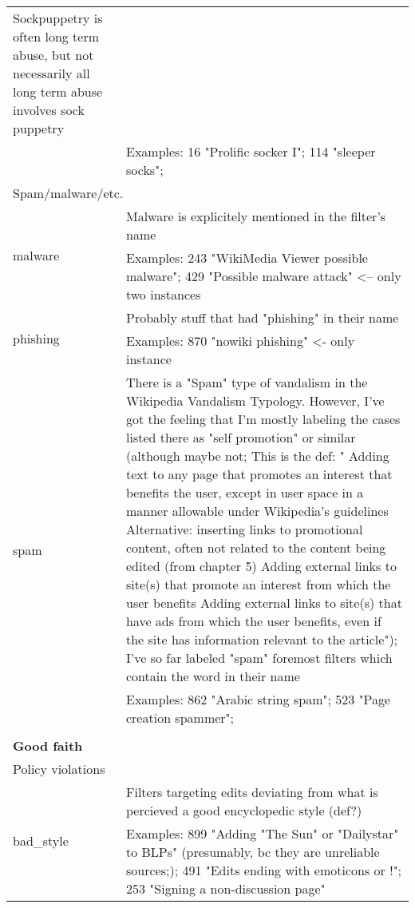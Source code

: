 \begin{longtable}{ | p{5cm} | p{9cm} | }
  Sockpuppetry is often long term abuse, but not necessarily all long term abuse involves sock puppetry \\
                                     & Examples: 16 "Prolific socker I"; 114 "sleeper socks";\\
    \hline \hline
        \multicolumn{2}{|l|}{Spam/malware/etc.} \\
    \hline
    \multirow{2}{*}{malware} & Malware is explicitely mentioned in the filter's name \\%
                                     & Examples: 243 "WikiMedia Viewer possible malware"; 429 "Possible malware attack" <-- only two instances\\
    \hline
    \multirow{2}{*}{phishing} & Probably stuff that had "phishing" in their name\\
                                     & Examples: 870 "nowiki phishing" <- only instance\\
    \hline
    \multirow{2}{*}{spam} & There is a "Spam" type of vandalism in the Wikipedia Vandalism Typology. However, I've got the feeling that I'm mostly labeling the cases listed there as "self promotion" or similar (although maybe not; This is the def: "    Adding text to any page that promotes an interest that benefits the user, except in user space in a manner allowable under Wikipedia's guidelines
  Alternative: inserting links to promotional content, often not related to the content being edited (from chapter 5)
    Adding external links to site(s) that promote an interest from which the user benefits
    Adding external links to site(s) that have ads from which the user benefits, even if the site has information relevant to the article");
  I've so far labeled "spam" foremost filters which contain the word in their name\\
                                     & Examples: 862 "Arabic string spam";  523 "Page creation spammer";\\
    \hline \hline
        \multicolumn{2}{|l|}{} \\
    \hline \hline
        \multicolumn{2}{|l|}{\textbf{Good faith}} \\
    \hline
        \multicolumn{2}{|l|}{Policy violations} \\
    \hline
    \multirow{2}{*}{bad\_style} & Filters targeting edits deviating from what is percieved a good encyclopedic style (def?)\\
                                     & Examples: 899 "Adding "The Sun" or "Dailystar" to BLPs" (presumably, bc they are unreliable sources;); 491 "Edits ending with emoticons or !"; 253 "Signing a non-discussion page"\\

\end{longtable}
